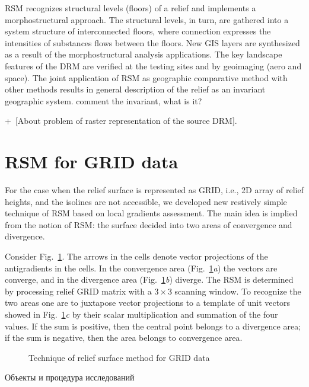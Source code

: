 \documentclass[runningheads]{AIIT}
\newcommand{\aaa}[2][acolor]{\noindent\textcolor{eclr}%
{+\ [}\textcolor{#1}{#2}\textcolor{eclr}{]}}
\newcommand{\nnn}[2][rcolor]{\noindent%
\textcolor{eclr}{}\textcolor{#1}{#2}\textcolor{eclr}{}}
\begin{document}
RSM recognizes structural levels (floors) of a relief and implements a morphostructural approach.  The structural levels, in turn, are gathered into a system structure of interconnected floors, where connection expresses the intensities of substances flows between the floors.  New GIS layers are synthesized as a result of the morphostructural analysis applications.  The key landscape features of the DRM are verified at the testing sites and by geoimaging (aero and space).  The joint application of RSM as geographic comparative method with other methods results in general description of the relief as an invariant geographic system. \nnn{comment the invariant, what is it?}

\aaa{About problem of raster representation of the source DRM}.

\section{RSM for GRID data}
\label{sec:rsm-grid-data}

For the case when the relief surface is represented as GRID, i.e., 2D array of relief heights, and the isolines are not accessible, we developed new restively simple technique of RSM based on local gradients assessment.  The main idea is implied from the notion of RSM: the surface decided into two areas of convergence and divergence.

Consider Fig.~\ref{fig:1}.  The arrows in the cells denote vector projections of the antigradients in the cells.  In the convergence area (Fig.~\ref{fig:1}\emph{a}) the vectors are converge, and in the divergence area (Fig.~\ref{fig:1}\emph{b}) diverge.  The RSM is determined by processing relief GRID matrix with a $3 \times 3$ scanning window.  To recognize the two areas one are to juxtapose vector projections to a template of unit vectors showed in Fig.~\ref{fig:1}\emph{c} by their scalar multiplication and summation of the four values.  If the sum is positive, then the central point belongs to a divergence area; if the sum is negative, then the area belongs to convergence area.

\begin{figure}[htb]
  \centering

  \caption{Technique of relief surface method for GRID data}
  \label{fig:1}
\end{figure}



Объекты и процедура исследований
\end{document}
